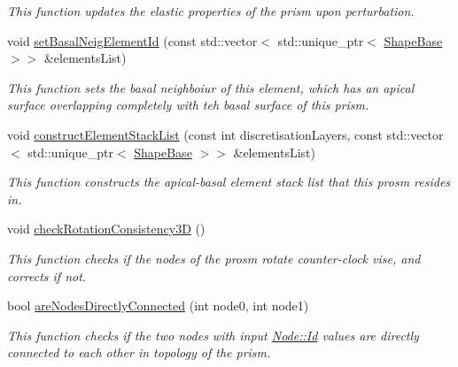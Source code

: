 \begin{DoxyCompactItemize}
\begin{DoxyCompactList}\small\item\em This function updates the elastic properties of the prism upon perturbation. \end{DoxyCompactList}\item 
void \hyperlink{classPrism_a6d95fcc54232f1b7777e988cdee98727}{set\+Basal\+Neig\+Element\+Id} (const std\+::vector$<$ std\+::unique\+\_\+ptr$<$ \hyperlink{classShapeBase}{Shape\+Base} $>$$>$ \&elements\+List)
\begin{DoxyCompactList}\small\item\em This function sets the basal neighboiur of this element, which has an apical surface overlapping completely with teh basal surface of this prism. \end{DoxyCompactList}\item 
\hypertarget{classPrism_a972fe7d50800036b4dfd724bcba2b32b}{}void \hyperlink{classPrism_a972fe7d50800036b4dfd724bcba2b32b}{construct\+Element\+Stack\+List} (const int discretisation\+Layers, const std\+::vector$<$ std\+::unique\+\_\+ptr$<$ \hyperlink{classShapeBase}{Shape\+Base} $>$$>$ \&elements\+List)\label{classPrism_a972fe7d50800036b4dfd724bcba2b32b}

\begin{DoxyCompactList}\small\item\em This function constructs the apical-\/basal element stack list that this prosm resides in. \end{DoxyCompactList}\item 
\hypertarget{classPrism_a85f9b472a3310e76ab0c76bd1fb7dd30}{}void \hyperlink{classPrism_a85f9b472a3310e76ab0c76bd1fb7dd30}{check\+Rotation\+Consistency3\+D} ()\label{classPrism_a85f9b472a3310e76ab0c76bd1fb7dd30}

\begin{DoxyCompactList}\small\item\em This function checks if the nodes of the prosm rotate counter-\/clock vise, and corrects if not. \end{DoxyCompactList}\item 
\hypertarget{classPrism_ae33eafcdbe69936cca29d7f23649c8cc}{}bool \hyperlink{classPrism_ae33eafcdbe69936cca29d7f23649c8cc}{are\+Nodes\+Directly\+Connected} (int node0, int node1)\label{classPrism_ae33eafcdbe69936cca29d7f23649c8cc}

\begin{DoxyCompactList}\small\item\em This function checks if the two nodes with input \hyperlink{classNode_a1bd379569cc1a8b96432e61971aed4d9}{Node\+::\+Id} values are directly connected to each other in topology of the prism. \end{DoxyCompactList}\end{DoxyCompactItemize}
